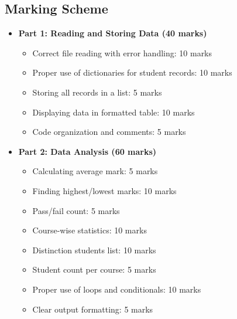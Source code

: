 \documentclass[a4paper,11pt]{article}
\theoremstyle{mytheor}
\begin{document}

\subsection*{Marking Scheme}

\begin{itemize}
    \item \textbf{Part 1: Reading and Storing Data (40 marks)}
    \begin{itemize}
        \item Correct file reading with error handling: 10 marks
        \item Proper use of dictionaries for student records: 10 marks
        \item Storing all records in a list: 5 marks
        \item Displaying data in formatted table: 10 marks
        \item Code organization and comments: 5 marks
    \end{itemize}
    
    \item \textbf{Part 2: Data Analysis (60 marks)}
    \begin{itemize}
        \item Calculating average mark: 5 marks
        \item Finding highest/lowest marks: 10 marks
        \item Pass/fail count: 5 marks
        \item Course-wise statistics: 10 marks
        \item Distinction students list: 10 marks
        \item Student count per course: 5 marks
        \item Proper use of loops and conditionals: 10 marks
        \item Clear output formatting: 5 marks
    \end{itemize}
    
\end{itemize}
\end{document}

